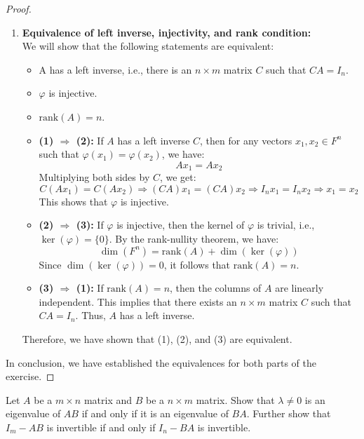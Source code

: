 \documentclass[openany]{book}
\begin{document}
\begin{proof}
\begin{enumerate}
    \item \textbf{Equivalence of left inverse, injectivity, and rank condition:} \\
    We will show that the following statements are equivalent:
    \begin{itemize}
        \item A has a left inverse, i.e., there is an $n \times m$ matrix $C$ such that $CA = I_n$.
        \item $\varphi$ is injective.
        \item $\text{rank}(A) = n$.
    \end{itemize}
    \begin{itemize}
        \item \textbf{(1) $\Rightarrow$ (2):} If $A$ has a left inverse $C$, then for any vectors $x_1, x_2 \in F^n$ such that $\varphi(x_1) = \varphi(x_2)$, we have:
        $$A x_1 = A x_2$$
        Multiplying both sides by $C$, we get:
        $$C(A x_1) = C(A x_2) \Rightarrow (CA)x_1 = (CA)x_2 \Rightarrow I_n x_1 = I_n x_2 \Rightarrow x_1 = x_2$$
        This shows that $\varphi$ is injective.
        \item \textbf{(2) $\Rightarrow$ (3):} If $\varphi$ is injective, then the kernel of $\varphi$ is trivial, i.e., $\ker(\varphi) = \{0\}$. By the rank-nullity theorem, we have:
        $$\dim(F^n) = \text{rank}(A) + \dim(\ker(\varphi))$$
        Since $\dim(\ker(\varphi)) = 0$, it follows that $\text{rank}(A) = n$.
        \item \textbf{(3) $\Rightarrow$ (1):} If $\text{rank}(A) = n$, then the columns of $A$ are linearly independent. This implies that there exists an $n \times m$ matrix $C$ such that $CA = I_n$. Thus, $A$ has a left inverse.
    \end{itemize}
    Therefore, we have shown that (1), (2), and (3) are equivalent.
\end{enumerate}
In conclusion, we have established the equivalences for both parts of the exercise.
\end{proof}
\begin{exercise}
    Let $A$ be a $m \times n$ matrix and $B$ be a $n \times m$ matrix. Show that $\lambda \neq 0$ is an eigenvalue of $AB$ if and only if it is an eigenvalue of $BA$. Further show that $I_m - AB$ is invertible if and only if $I_n - BA$ is invertible.
\end{exercise}
\end{document}
